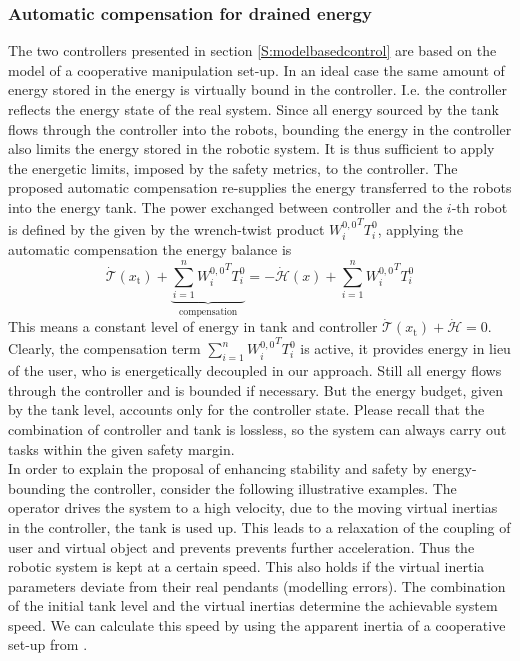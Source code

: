 \documentclass[a4paper,twoside, openright,12pt]{report}
\newcommand{\g}[1]{\text{#1}}
\begin{document}
\subsubsection{Automatic compensation for drained energy}
The two controllers presented in section \ref{S:modelbasedcontrol} are based on the model of a cooperative manipulation set-up. In an ideal case the same amount of energy stored in the energy is virtually bound in the controller. I.e. the controller reflects the energy state of the real system. Since all energy sourced by the tank flows through the controller into the robots, bounding the energy in the controller also limits the energy stored in the robotic system.
It is thus sufficient to apply the energetic limits, imposed by the safety metrics, to the controller. The proposed automatic compensation re-supplies the energy transferred to the robots into the energy tank. 
The power exchanged between controller and the $i$-th robot is defined by the given by the wrench-twist product ${W_i^{0,0}}^T T_i^0$, applying the automatic compensation the energy balance is
\begin{equation}
\dot{\mathcal{T}}(x_\g{t}) + \underbrace{\sum_{i=1}^n {W_i^{0,0}}^T T_i^0}_{\text{compensation}} = - \dot{{\mathcal{H}}}(x) + \sum_{i=1}^n {W_i^{0,0}}^T T_i^0
\end{equation}
This means a constant level of energy in tank and controller $\dot{\mathcal{T}}(x_\g{t})+\dot{\mathcal{H}} = 0$.
Clearly, the compensation term $\sum_{i=1}^n {W_i^{0,0}}^T T_i^0$ is active, it provides energy in lieu of the user, who is energetically decoupled in our approach. Still all energy flows through the controller and is bounded if necessary. But the energy budget, given by the tank level, accounts only for the controller state. Please recall that the combination of controller and tank is lossless, so the system can always carry out tasks within the given safety margin.\\ 
In order to explain the proposal of enhancing stability and safety by energy-bounding the controller, consider the following illustrative examples.
The operator drives the system to a high velocity, due to the moving virtual inertias in the controller, the tank is used up. This leads to a relaxation of the coupling of user and virtual object and prevents prevents further acceleration. Thus the robotic system is kept at a certain speed. This also holds if the virtual inertia parameters deviate from their real pendants (modelling errors). The combination of the initial tank level and the virtual inertias determine the achievable system speed. We can calculate this speed by using the apparent inertia of a cooperative set-up from \cite{Erhart_16}.\\ 
\end{document}
